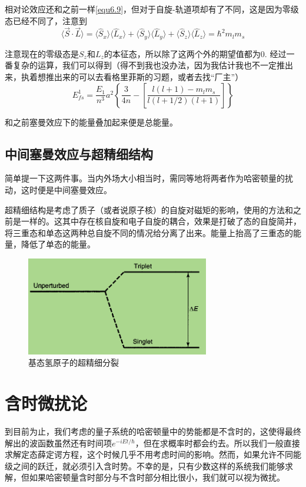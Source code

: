 \documentclass[UTF8]{ctexart}
\begin{document}
\noindent 相对论效应还和之前一样\autoref{equ6.9}，但对于自旋-轨道项却有了不同，这是因为零级态已经不同了，注意到
\begin{equation}
    \langle \vec{S} \cdot \vec{L} \rangle = \langle \hat{S}_x \rangle  \langle \hat{L}_x \rangle +\langle \hat{S}_y \rangle  \langle \hat{L}_y \rangle +\langle \hat{S}_z \rangle  \langle \hat{L}_z \rangle = \hbar^2 m_l m_s
\end{equation}

\noindent 注意现在的零级态是$S_z$和$L_z$的本征态，所以除了这两个外的期望值都为0. 经过一番复杂的运算，我们可以得到（得不到我也没办法，因为我估计我也不一定推出来，执着想推出来的可以去看格里菲斯的习题，或者去找“厂主”）
\begin{equation}
    E_{fs}^1 = \frac{E_1}{n^3} a^2 \left\{\frac{3}{4n} - \left[\frac{l(l+1)-m_lm_s}{l(l+1/2)(l+1)}\right]\right\}
\end{equation}

    和之前塞曼效应下的能量叠加起来便是总能量。

    \subsection{中间塞曼效应与超精细结构}
    简单提一下这两件事。当内外场大小相当时，需同等地将两者作为哈密顿量的扰动，这时便是中间塞曼效应。

    超精细结构是考虑了质子（或者说原子核）的自旋对磁矩的影响，使用的方法和之前是一样的。这其中存在核自旋和电子自旋的耦合，效果是打破了态的自旋简并，将三重态和单态这两种总自旋不同的情况给分离了出来。能量上抬高了三重态的能量，降低了单态的能量。
    \begin{figure}[htb]
        \centering
        \includegraphics[width=8cm]{figure6-2.png}
        \caption{基态氢原子的超精细分裂}
        \label{figure6.2}
    \end{figure}

    \section{含时微扰论}
    到目前为止，我们考虑的量子系统的哈密顿量中的势能都是不含时的，这使得最终解出的波函数虽然还有时间项$e^{-iEt/\hbar}$，但在求概率时都会约去。所以我们一般直接求解定态薛定谔方程，这个时候几乎不用考虑时间的影响。然而，如果允许不同能级之间的跃迁，就必须引入含时势。不幸的是，只有少数这样的系统我们能够求解，但如果哈密顿量含时部分与不含时部分相比很小，我们就可以视为微扰。
\end{document}

